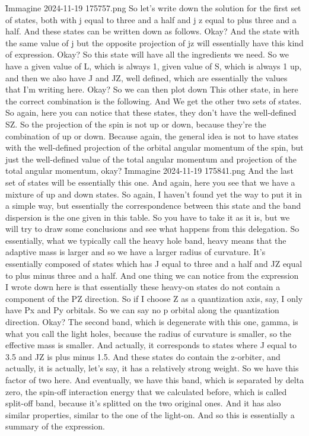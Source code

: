 \f{Immagine 2024-11-19 175757.png}
So let's write down the solution for the first set of states, both with j equal to three and a half and j z equal to plus three and a half. And these states can be written down as follows. Okay? And the state with the same value of j but the opposite projection of jz will essentially have this kind of expression. Okay? So this state will have all the ingredients we need. So we have a given value of L, which is always 1, given value of S, which is always 1 up, and then we also have J and JZ, well defined, which are essentially the values that I'm writing here. Okay? So we can then plot down This other state, in here the correct combination is the following. And We get the other two sets of states. So again, here you can notice that these states, they don't have the well-defined SZ. So the projection of the spin is not up or down, because they're the combination of up or down. Because again, the general idea is not to have states with the well-defined projection of the orbital angular momentum of the spin, but just the well-defined value of the total angular momentum and projection of the total angular momentum, okay?
\f{Immagine 2024-11-19 175841.png}
And the last set of states will be essentially this one. And again, here you see that we have a mixture of up and down states. So again, I haven't found yet the way to put it in a simple way, but essentially the correspondence between this state and the band dispersion is the one given in this table. So you have to take it as it is, but we will try to draw some conclusions and see what happens from this delegation. So essentially, what we typically call the heavy hole band, heavy means that the adaptive mass is larger and so we have a larger radius of curvature.
It's essentially composed of states which has J equal to three and a half and JZ equal to plus minus three and a half. And one thing we can notice from the expression I wrote down here is that essentially these heavy-on states do not contain a component of the PZ direction. So if I choose Z as a quantization axis, say, I only have Px and Py orbitals. So we can say no p orbital along the quantization direction. Okay? The second band, which is degenerate with this one, gamma, is what you call the light holes, because the radius of curvature is smaller, so the effective mass is smaller. And actually, it corresponds to states where J equal to 3.5 and JZ is plus minus 1.5. And these states do contain the z-orbiter, and actually, it is actually, let's say, it has a relatively strong weight. So we have this factor of two here. And eventually, we have this band, which is separated by delta zero, the spin-off interaction energy that we calculated before, which is called split-off band, because it's splitted on the two original ones. And it has also similar properties, similar to the one of the light-on. And so this is essentially a summary of the expression.
